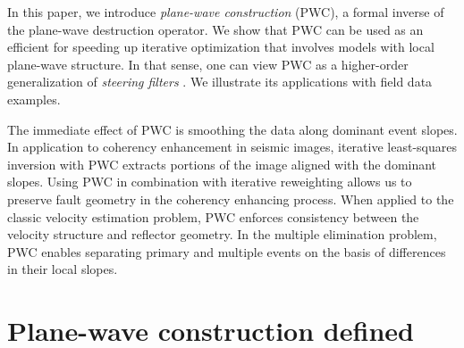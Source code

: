 In this paper, we introduce \emph{plane-wave construction} (PWC), a
formal inverse of the plane-wave destruction operator. We show that
PWC can be used as an efficient  
for speeding up iterative optimization that involves models with local
plane-wave structure.  In that sense, one can view PWC as a
higher-order generalization of \emph{steering filters}
\cite[]{SEG-1998-1851,clapp}. We illustrate its applications with
field data examples.

The immediate effect of PWC is smoothing the data along dominant event
slopes. In application to coherency enhancement in seismic images,
iterative least-squares inversion with PWC 
 extracts portions of the image aligned with the
dominant slopes. Using PWC in combination with iterative reweighting
allows us to preserve fault geometry in the coherency enhancing
process. When applied to the classic velocity estimation problem, PWC
enforces consistency between the velocity structure and reflector
geometry. In the multiple elimination problem, PWC
  enables separating
primary and multiple events on the basis of differences in their local
slopes.


\begin{comment}
A more powerful approach to regularization involves shaping operators
that project the estimated model into the space of acceptable models
\cite[]{shape}. In the last section of this paper, we show how to
transform plane-wave construction into plane-wave shaping by following
an analogy with triangle filtering.
\end{comment}

\section{Plane-wave construction defined}

